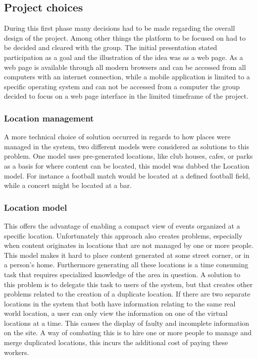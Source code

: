 \subsection{Project choices}
\label{subsec:PrelimWorkChoices}

During this first phase many decisions had to be made regarding the overall design of the project. Among other things the platform to be focused on had to be decided and cleared with the group. The initial presentation stated participation as a goal and the illustration of the idea was as a web page. As a web page is available through all modern browsers and can be accessed from all computers with an internet connection, while a mobile application is limited to a specific operating system and can not be accessed from a computer the group decided to focus on a web page interface in the limited timeframe of the project.


\subsubsection{Location management}
A more technical choice of solution occurred in regards to how places were managed in the system, two different models were considered as solutions to this problem. One model uses pre-generated locations, like club houses, cafes, or parks as a basis for where content can be located, this model was dubbed the Location model. For instance a football match would be located at a defined football field, while a concert might be located at a bar.

\subsubsection{Location model}
This offers the advantage of enabling a compact view of events organized at a specific location. Unfortunately this approach also creates problems, especially when content originates in locations that are not managed by one or more people. This model makes it hard to place content generated at some street corner, or in a person's home. Furthermore generating all these locations is a time consuming task that requires specialized knowledge of the area in question. A solution to this problem is to delegate this task to users of the system, but that creates other problems related to the creation of a duplicate location. If there are two separate locations in the system that both have information relating to the same real world location, a user can only view the information on one of the virtual locations at a time. This causes the display of faulty and incomplete information on the site. A way of combating this is to hire one or more people to manage and merge duplicated locations, this incurs the additional cost of paying these workers.


